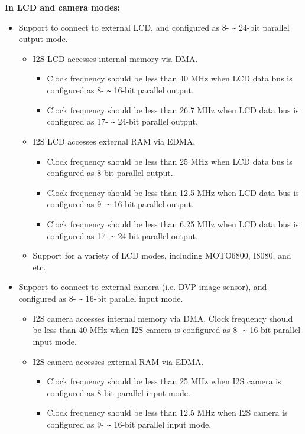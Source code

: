 \documentclass[main\_\_EN.tex]{subfiles}
\begin{document}
\textbf{In LCD and camera modes:}
\begin{itemize}
    \item Support to connect to external LCD, and configured as 8- \verb+~+ 24-bit parallel output mode.
    \begin{itemize}
        \item I2S LCD accesses internal memory via DMA.
            \begin{itemize}
            \item Clock frequency should be less than 40 MHz when LCD data bus is configured as 8- \verb+~+ 16-bit parallel output.
            \item Clock frequency should be less than 26.7 MHz when LCD data bus is configured as 17- \verb+~+ 24-bit parallel output.
            \end{itemize}

        \item I2S LCD accesses external RAM via EDMA.
            \begin{itemize}
            \item Clock frequency should be less than 25 MHz when LCD data bus is configured as 8-bit parallel output.
            \item Clock frequency should be less than 12.5 MHz when LCD data bus is configured as 9- \verb+~+ 16-bit parallel output.
            \item Clock frequency should be less than 6.25 MHz when LCD data bus is configured as 17- \verb+~+ 24-bit parallel output.
            \end{itemize}
        \item Support for a variety of LCD modes, including MOTO6800, I8080, and etc.
    \end{itemize}

    \item Support to connect to external camera (i.e. DVP image sensor), and configured as 8- \verb+~+ 16-bit parallel input mode.
    \begin{itemize}
        \item I2S camera accesses internal memory via DMA. Clock frequency should be less than 40 MHz when I2S camera is configured as 8- \verb+~+ 16-bit parallel input mode.

        \item I2S camera accesses external RAM via EDMA.
            \begin{itemize}
            \item Clock frequency should be less than 25 MHz when I2S camera is configured as 8-bit parallel input mode.
            \item Clock frequency should be less than 12.5 MHz when I2S camera is configured as 9- \verb+~+ 16-bit parallel input mode.
            \end{itemize}
    \end{itemize}


\end{itemize}
\end{document}
